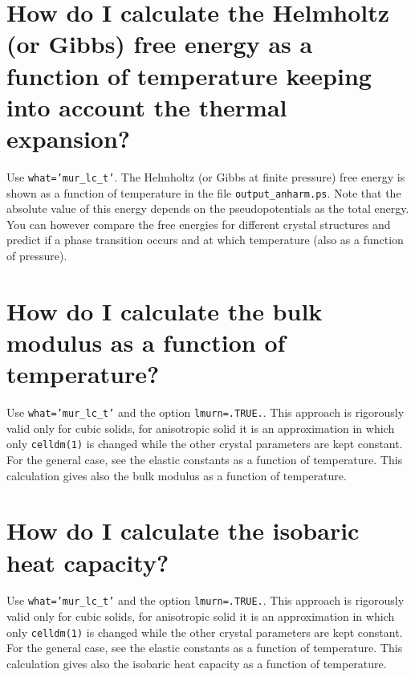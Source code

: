 \documentclass[12pt,a4paper]{article}
\begin{document}
\newpage
\section{\color{coral}How do I calculate the Helmholtz (or Gibbs) free energy
as a function of temperature keeping into account the thermal expansion?}
Use \texttt{what='mur\_lc\_t'}. The Helmholtz (or Gibbs at finite pressure) 
free energy is shown as a function of temperature in the file 
\texttt{output\_anharm.ps}. Note that the absolute value of this energy
depends on the pseudopotentials as the total energy. You can however
compare the free energies for different crystal structures 
and predict if a phase transition occurs and at which temperature (also 
as a function of pressure).

\newpage
\section{\color{coral}How do I calculate the bulk modulus as a function of 
temperature?}
Use \texttt{what='mur\_lc\_t'} and the option \texttt{lmurn=.TRUE.}.
This approach is rigorously valid only for cubic solids, for anisotropic
solid it is an approximation in which only \texttt{celldm(1)} is
changed while the other crystal parameters are kept constant. 
For the general case, see the elastic constants as a function of 
temperature. This calculation gives also the bulk modulus as a function 
of temperature.

\newpage
\section{\color{coral}How do I calculate the isobaric heat capacity?}
Use \texttt{what='mur\_lc\_t'} and the option \texttt{lmurn=.TRUE.}.
This approach is rigorously valid only for cubic solids, for anisotropic
solid it is an approximation in which only \texttt{celldm(1)} is
changed while the other crystal parameters are kept constant.
For the general case, see the elastic constants
as a function of temperature. This calculation gives also the 
isobaric heat capacity as a function of temperature.

\newpage
\end{document}
